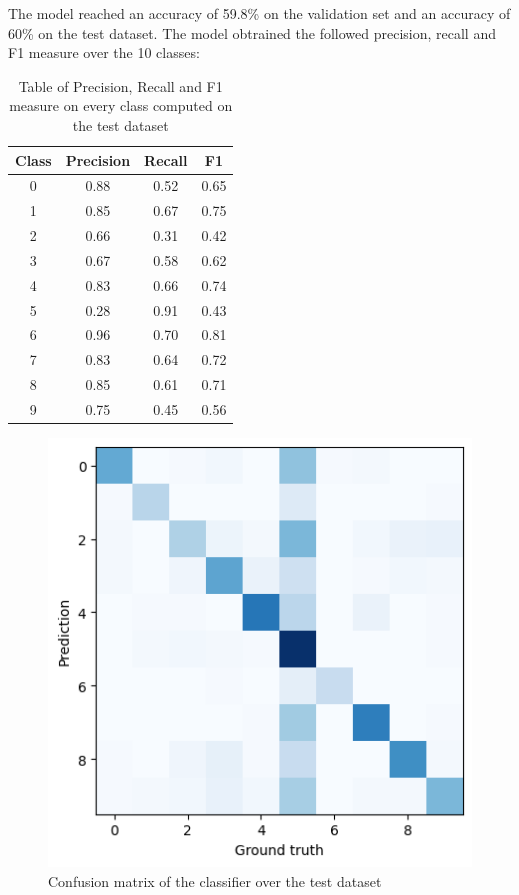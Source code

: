 \documentclass[12pt,journal,compsoc]{IEEEtran}
\begin{document}
The model reached an accuracy of 59.8\% on the validation set and an accuracy of 60\% on the test dataset. The model obtrained the followed precision, recall and F1 measure over the 10 classes: 
\begin{table}[ht]
	\centering
	\begin{tabular}{c c c c }
		Class & Precision & Recall & F1  \\
		\hline
		0 & 0.88 &0.52  &0.65     \\
		1 & 0.85 &0.67  &0.75      \\
		2 & 0.66 &0.31  &0.42       \\
		3 & 0.67 &0.58  &0.62        \\ 
		4 & 0.83 &0.66  &0.74        \\
		5 & 0.28 &0.91  &0.43        \\
		6 & 0.96 &0.70  &0.81       \\
		7 & 0.83 &0.64  &0.72        \\
		8 & 0.85 &0.61  &0.71        \\
		9 & 0.75 &0.45  &0.56        \\
	\end{tabular}
	\caption{Table of Precision, Recall and F1 measure on every class computed on the test dataset}
	\end{table}
	\begin{figure}[H]
		\begin{center}
		\includegraphics[scale=.75]{./images/confmat_sound_mlp.png}
		\end{center}
		\caption{Confusion matrix of the classifier over the test dataset}
	\end{figure}
\end{document}
